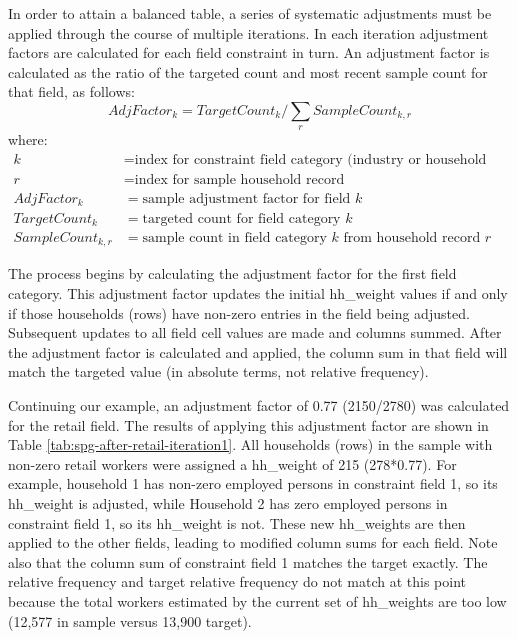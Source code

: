 In order to attain a balanced table, a series of systematic adjustments must be applied through the course of multiple iterations. In each iteration adjustment factors are calculated for each field constraint in turn. An adjustment factor is calculated as the ratio of the targeted count and most recent sample count for that field, as follows:
\begin{equation}   %
AdjFactor_k = TargetCount_k / \sum_r SampleCount_{k,r}
\end{equation}
\noindent where:
\begin{align*}
k &= \text{index for constraint field category (industry or household category)} \\
r &= \text{index for sample household record} \\
AdjFactor_k &= \text{sample adjustment factor for field $k$} \\
TargetCount_k &= \text{targeted count for field category $k$} \\
SampleCount_{k,r} &= \text{sample count in field category $k$ from household record $r$}
\end{align*} 

The process begins by calculating the adjustment factor for the first field category. This adjustment factor updates the initial hh\_weight values if and only if those households (rows) have non-zero entries in the field being adjusted. Subsequent updates to all field cell values are made and columns summed. After the adjustment factor is calculated and applied, the column sum in that field will match the targeted value (in absolute terms, not relative frequency). 

Continuing our example, an adjustment factor of 0.77 (2150/2780) was calculated for the retail field. The results of applying this adjustment factor are shown in Table \ref{tab:spg-after-retail-iteration1}. All households (rows) in the sample with non-zero retail workers were assigned a hh\_weight of 215 (278*0.77). For example, household 1 has non-zero employed persons in constraint field 1, so its hh\_weight is adjusted, while Household 2 has zero employed persons in constraint field 1, so its hh\_weight is not. These new hh\_weights are then applied to the other fields, leading to modified column sums for each field. Note also that the column sum of constraint field 1 matches the target exactly. The relative frequency and target relative frequency do not match at this point because the total workers estimated by the current set of hh\_weights are too low (12,577 in sample versus 13,900 target).

